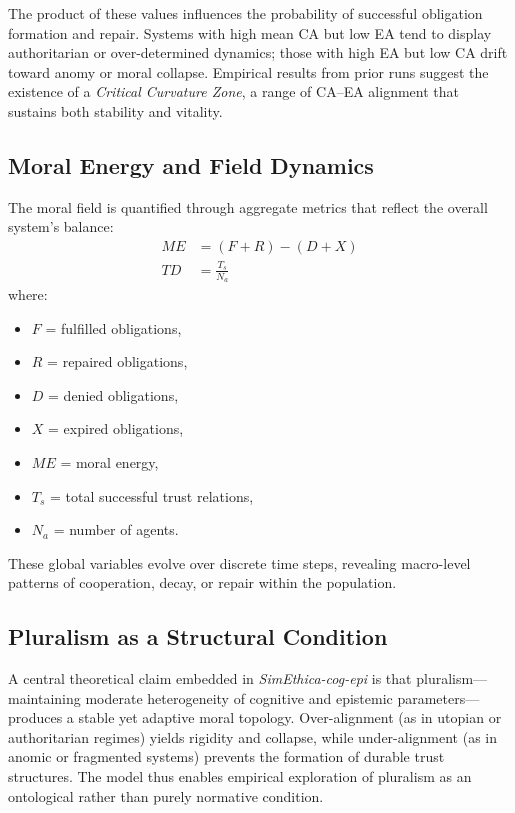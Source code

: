 \documentclass[11pt]{article}
\begin{document}
The product of these values influences the probability of successful obligation formation and repair. Systems with high mean CA but low EA tend to display authoritarian or over-determined dynamics; those with high EA but low CA drift toward anomy or moral collapse. Empirical results from prior runs suggest the existence of a \textit{Critical Curvature Zone}, a range of CA–EA alignment that sustains both stability and vitality.

\subsection{Moral Energy and Field Dynamics}

The moral field is quantified through aggregate metrics that reflect the overall system’s balance:
\begin{align}
  ME &= (F + R) - (D + X) \\
  TD &= \frac{T_s}{N_a}
\end{align}
where:
\begin{itemize}
  \item $F$ = fulfilled obligations,
  \item $R$ = repaired obligations,
  \item $D$ = denied obligations,
  \item $X$ = expired obligations,
  \item $ME$ = moral energy,
  \item $T_s$ = total successful trust relations,
  \item $N_a$ = number of agents.
\end{itemize}

These global variables evolve over discrete time steps, revealing macro-level patterns of cooperation, decay, or repair within the population.

\subsection{Pluralism as a Structural Condition}

A central theoretical claim embedded in \textit{SimEthica-cog-epi} is that pluralism—maintaining moderate heterogeneity of cognitive and epistemic parameters—produces a stable yet adaptive moral topology. Over-alignment (as in utopian or authoritarian regimes) yields rigidity and collapse, while under-alignment (as in anomic or fragmented systems) prevents the formation of durable trust structures. The model thus enables empirical exploration of pluralism as an ontological rather than purely normative condition.
\end{document}
